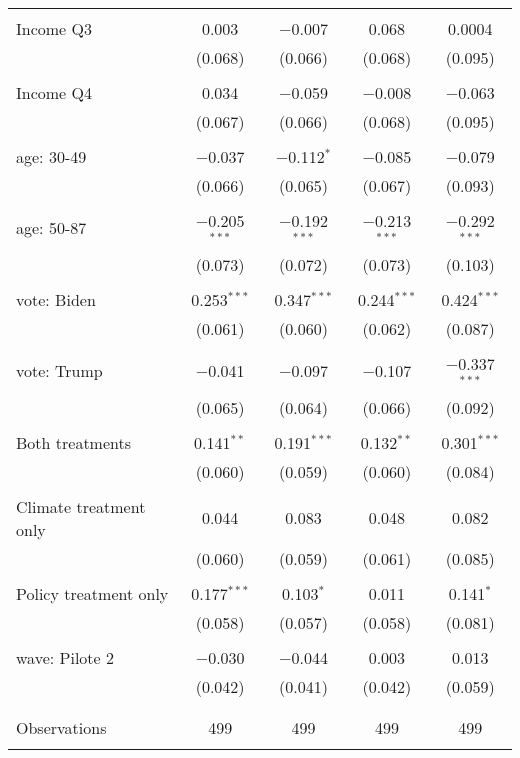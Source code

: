 \begin{tabular}{@{\extracolsep{5pt}}lcccc}
  & & & & \\ 
 Income Q3 & 0.003 & $-$0.007 & 0.068 & 0.0004 \\ 
  & (0.068) & (0.066) & (0.068) & (0.095) \\ 
  & & & & \\ 
 Income Q4 & 0.034 & $-$0.059 & $-$0.008 & $-$0.063 \\ 
  & (0.067) & (0.066) & (0.068) & (0.095) \\ 
  & & & & \\ 
 age: 30-49 & $-$0.037 & $-$0.112$^{*}$ & $-$0.085 & $-$0.079 \\ 
  & (0.066) & (0.065) & (0.067) & (0.093) \\ 
  & & & & \\ 
 age: 50-87 & $-$0.205$^{***}$ & $-$0.192$^{***}$ & $-$0.213$^{***}$ & $-$0.292$^{***}$ \\ 
  & (0.073) & (0.072) & (0.073) & (0.103) \\ 
  & & & & \\ 
 vote: Biden & 0.253$^{***}$ & 0.347$^{***}$ & 0.244$^{***}$ & 0.424$^{***}$ \\ 
  & (0.061) & (0.060) & (0.062) & (0.087) \\ 
  & & & & \\ 
 vote: Trump & $-$0.041 & $-$0.097 & $-$0.107 & $-$0.337$^{***}$ \\ 
  & (0.065) & (0.064) & (0.066) & (0.092) \\ 
  & & & & \\ 
 Both treatments & 0.141$^{**}$ & 0.191$^{***}$ & 0.132$^{**}$ & 0.301$^{***}$ \\ 
  & (0.060) & (0.059) & (0.060) & (0.084) \\ 
  & & & & \\ 
 Climate treatment only & 0.044 & 0.083 & 0.048 & 0.082 \\ 
  & (0.060) & (0.059) & (0.061) & (0.085) \\ 
  & & & & \\ 
 Policy treatment only & 0.177$^{***}$ & 0.103$^{*}$ & 0.011 & 0.141$^{*}$ \\ 
  & (0.058) & (0.057) & (0.058) & (0.081) \\ 
  & & & & \\ 
 wave: Pilote 2 & $-$0.030 & $-$0.044 & 0.003 & 0.013 \\ 
  & (0.042) & (0.041) & (0.042) & (0.059) \\ 
  & & & & \\ 
\hline \\[-1.8ex] 

Observations & 499 & 499 & 499 & 499 \\ 
\hline 
\hline \\[-1.8ex] 
\end{tabular} 